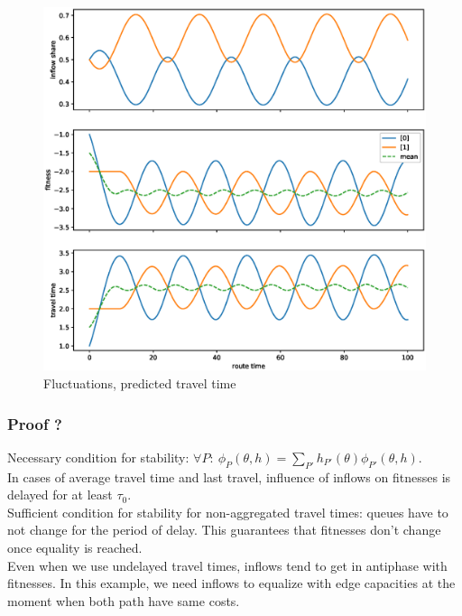 \documentclass[12pt]{article}
\begin{document}
\begin{center}
	\begin{figure}
	\includegraphics[scale=0.5]{img/replicator_pred_tt.eps}
	\caption{Fluctuations, predicted travel time }
	\label{fig:fluctuations_pred}

	\end{figure}
	
\end{center}

\subsubsection*{Proof ?}

Necessary condition for stability: $ \forall P: ~ \phi_P(\theta, h) = \sum_{P'} h_{P'}(\theta) \phi_{P'}(\theta, h) $. \\
In cases of average travel time and last travel, influence of inflows on fitnesses is delayed for at least $\tau_0$. \\ 

Sufficient condition for stability for non-aggregated travel times: queues have to not change for the period of delay. This guarantees that fitnesses don't change once equality is reached.
\\

Even when we use undelayed travel times, inflows tend to get in antiphase with fitnesses.
In this example, we need inflows to equalize with edge capacities at the moment when both path have same costs.
\end{document}
